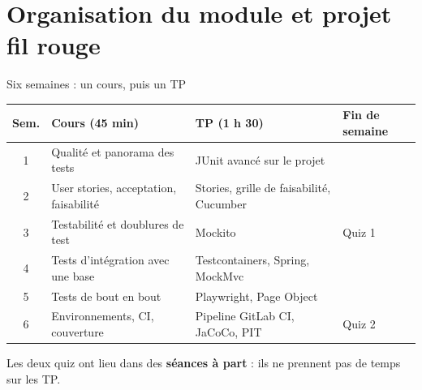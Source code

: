\documentclass[aspectratio=169,10pt]{beamer}
\begin{document}
\section{Organisation du module et projet fil rouge}

\begin{frame}{Six semaines : un cours, puis un TP}
  \small
  \begin{datacard}
    \begin{tabular}{@{}clll@{}}
      \toprule
      \textbf{Sem.} & \textbf{Cours (45 min)} & \textbf{TP (1 h 30)} & \textbf{Fin de semaine} \\
      \midrule
      1 & Qualité et panorama des tests & JUnit avancé sur le projet & \\
      2 & User stories, acceptation, faisabilité & Stories, grille de faisabilité, Cucumber & \\
      3 & Testabilité et doublures de test & Mockito & \alert{Quiz 1} \\
      4 & Tests d'intégration avec une base & Testcontainers, Spring, MockMvc & \\
      5 & Tests de bout en bout & Playwright, Page Object & \\
      6 & Environnements, CI, couverture & Pipeline GitLab CI, JaCoCo, PIT & \alert{Quiz 2} \\
      \bottomrule
    \end{tabular}
  \end{datacard}
  \vspace{2mm}
  \begin{center}
    Les deux quiz ont lieu dans des \textbf{séances à part} : ils ne prennent pas de temps sur les TP.
  \end{center}
\end{frame}
\end{document}
